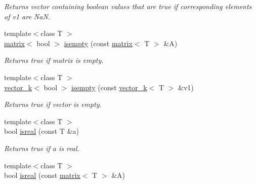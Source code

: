 \begin{DoxyCompactItemize}
\begin{DoxyCompactList}\small\item\em Returns vector containing boolean values that are true if corresponding elements of v1 are Na\-N. \end{DoxyCompactList}\item 
\hypertarget{namespacekeycpp_acc2de8926c54a2048a0d8965e7d70995}{{\footnotesize template$<$class T $>$ }\\\hyperlink{classkeycpp_1_1matrix}{matrix}$<$ bool $>$ \hyperlink{namespacekeycpp_acc2de8926c54a2048a0d8965e7d70995}{isempty} (const \hyperlink{classkeycpp_1_1matrix}{matrix}$<$ T $>$ \&A)}\label{namespacekeycpp_acc2de8926c54a2048a0d8965e7d70995}

\begin{DoxyCompactList}\small\item\em Returns true if matrix is empty. \end{DoxyCompactList}\item 
\hypertarget{namespacekeycpp_aef3406643c82187b13c5ab0b6da788b6}{{\footnotesize template$<$class T $>$ }\\\hyperlink{classkeycpp_1_1vector__k}{vector\-\_\-k}$<$ bool $>$ \hyperlink{namespacekeycpp_aef3406643c82187b13c5ab0b6da788b6}{isempty} (const \hyperlink{classkeycpp_1_1vector__k}{vector\-\_\-k}$<$ T $>$ \&v1)}\label{namespacekeycpp_aef3406643c82187b13c5ab0b6da788b6}

\begin{DoxyCompactList}\small\item\em Returns true if vector is empty. \end{DoxyCompactList}\item 
\hypertarget{namespacekeycpp_a81a8c955cdbeb60181f6bf7d6553ac53}{{\footnotesize template$<$class T $>$ }\\bool \hyperlink{namespacekeycpp_a81a8c955cdbeb60181f6bf7d6553ac53}{isreal} (const T \&a)}\label{namespacekeycpp_a81a8c955cdbeb60181f6bf7d6553ac53}

\begin{DoxyCompactList}\small\item\em Returns true if a is real. \end{DoxyCompactList}\item 
\hypertarget{namespacekeycpp_a62d7118882bac24ab403ffb5f8ee7034}{{\footnotesize template$<$class T $>$ }\\bool \hyperlink{namespacekeycpp_a62d7118882bac24ab403ffb5f8ee7034}{isreal} (const \hyperlink{classkeycpp_1_1matrix}{matrix}$<$ T $>$ \&A)}\label{namespacekeycpp_a62d7118882bac24ab403ffb5f8ee7034}


\end{DoxyCompactItemize}
